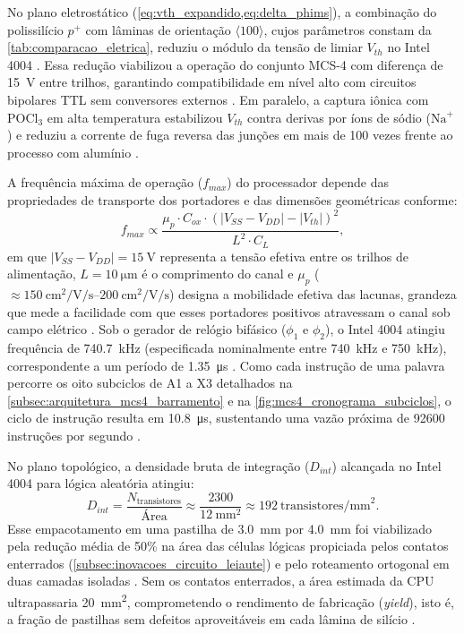 No plano eletrostático (\cref{eq:vth_expandido,eq:delta_phims}), a combinação do polissilício $p^+$ com lâminas de orientação $\langle 100 \rangle$, cujos parâmetros constam da \cref{tab:comparacao_eletrica}, reduziu o módulo da tensão de limiar $V_{th}$ no Intel 4004 \cite{klein1972patent, sze2006}. Essa redução viabilizou a operação do conjunto MCS-4 com diferença de \SI{15}{\volt} entre trilhos, garantindo compatibilidade em nível alto com circuitos bipolares TTL sem conversores externos \cite{intel1971datasheet}. Em paralelo, a captura iônica com $\text{POCl}_3$ em alta temperatura estabilizou $V_{th}$ contra derivas por íons de sódio ($\text{Na}^+$) e reduziu a corrente de fuga reversa das junções em mais de 100 vezes frente ao processo com alumínio \cite{faggin1970}.

A frequência máxima de operação ($f_{max}$) do processador depende das propriedades de transporte dos portadores e das dimensões geométricas conforme:
\begin{equation}
\label{eq:res_fmax}
f_{max} \propto \frac{\mu_p \cdot C_{ox} \cdot (|V_{SS} - V_{DD}| - |V_{th}|)^2}{L^2 \cdot C_L},
\end{equation}
em que $|V_{SS} - V_{DD}| = \SI{15}{\volt}$ representa a tensão efetiva entre os trilhos de alimentação, $L = \SI{10}{\micro\meter}$ é o comprimento do canal e $\mu_p$ ($\approx \SIrange{150}{200}{\centi\meter\squared\per\volt\per\second}$) designa a mobilidade efetiva das lacunas, grandeza que mede a facilidade com que esses portadores positivos atravessam o canal sob campo elétrico \cite{sze2006}. Sob o gerador de relógio bifásico ($\phi_1$ e $\phi_2$), o Intel 4004 atingiu frequência de \SI{740,7}{\kilo\hertz} (especificada nominalmente entre \SI{740}{\kilo\hertz} e \SI{750}{\kilo\hertz}), correspondente a um período de \SI{1,35}{\micro\second} \cite{intel1971datasheet, intel1973mcs4}. Como cada instrução de uma palavra percorre os oito subciclos de A1 a X3 detalhados na \cref{subsec:arquitetura_mcs4_barramento} e na \cref{fig:mcs4_cronograma_subciclos}, o ciclo de instrução resulta em \SI{10,8}{\micro\second}, sustentando uma vazão próxima de \num{92600} instruções por segundo \cite{intel1973mcs4, faggin1996}.

No plano topológico, a densidade bruta de integração ($D_{int}$) alcançada no Intel 4004 para lógica aleatória atingiu:
\begin{equation}
\label{eq:res_densidade_int}
D_{int} = \frac{N_{\text{transistores}}}{\text{Área}} \approx \frac{2300}{\SI{12}{\milli\meter\squared}} \approx \num{192}\ \text{transistores/mm}^2.
\end{equation}
Esse empacotamento em uma pastilha de \SI{3,0}{\milli\meter} por \SI{4,0}{\milli\meter} foi viabilizado pela redução média de 50\% na área das células lógicas propiciada pelos contatos enterrados (\cref{subsec:inovacoes_circuito_leiaute}) e pelo roteamento ortogonal em duas camadas isoladas \cite{vadasz1972patent, faggin2018howwemade, faggin2021}. Sem os contatos enterrados, a área estimada da CPU ultrapassaria \SI{20}{\milli\meter\squared}, comprometendo o rendimento de fabricação (\textit{yield}), isto é, a fração de pastilhas sem defeitos aproveitáveis em cada lâmina de silício \cite{chm2004faggin}.

